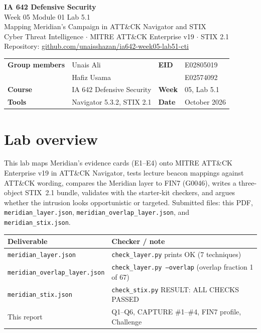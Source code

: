 \documentclass[11pt,letterpaper]{article}
\begin{document}
\begin{center}
{\LARGE\bfseries IA 642 Defensive Security}\\[0.25em]
{\Large Week 05 Module 01 Lab 5.1}\\[0.2em]
{\large Mapping Meridian's Campaign in ATT\&CK Navigator and STIX}\\[0.35em]
{\small Cyber Threat Intelligence $\cdot$ MITRE ATT\&CK Enterprise v19 $\cdot$ STIX 2.1}\\[0.25em]
{\small Repository:
\href{https://github.com/unaisshazan/ia642-week05-lab51-cti}{github.com/unaisshazan/ia642-week05-lab51-cti}}\\[0.25em]
\end{center}

\begin{tabularx}{\textwidth}{@{}l X l l@{}}
\toprule
\textbf{Group members} & Unais Ali & \textbf{EID} & E02805019 \\
 & Hafiz Usama &  & E02574092 \\
\textbf{Course} & IA 642 Defensive Security & \textbf{Week} & 05, Lab 5.1 \\
\textbf{Tools} & Navigator 5.3.2, STIX 2.1 & \textbf{Date} & October 2026 \\
\bottomrule
\end{tabularx}

\vspace{0.55em}

\section*{Lab overview}

This lab maps Meridian's evidence cards (E1--E4) onto MITRE ATT\&CK Enterprise v19 in ATT\&CK Navigator, tests lecture beacon mappings against ATT\&CK wording, compares the Meridian layer to FIN7 (G0046), writes a three-object STIX~2.1 bundle, validates with the starter-kit checkers, and argues whether the intrusion looks opportunistic or targeted. Submitted files: this PDF, \texttt{meridian\_layer.json}, \texttt{meridian\_overlap\_layer.json}, and \texttt{meridian\_stix.json}.

\begin{tabularx}{\textwidth}{@{}l Y@{}}
\toprule
\textbf{Deliverable} & \textbf{Checker / note} \\
\midrule
\texttt{meridian\_layer.json} & \texttt{check\_layer.py} prints OK (7 techniques) \\
\texttt{meridian\_overlap\_layer.json} & \texttt{check\_layer.py --overlap} (overlap fraction 1 of 67) \\
\texttt{meridian\_stix.json} & \texttt{check\_stix.py} RESULT: ALL CHECKS PASSED \\
This report & Q1--Q6, CAPTURE \#1--\#4, FIN7 profile, Challenge \\
\bottomrule
\end{tabularx}
\end{document}
